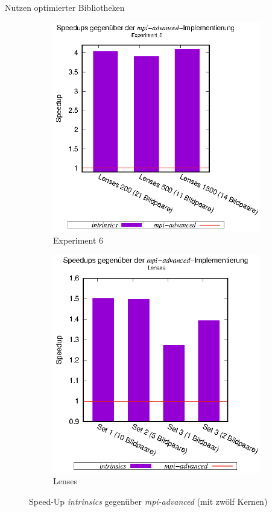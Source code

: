 \begin{frame}{Nutzen optimierter Bibliotheken}
	\begin{figure}[h]
		\begin{subfigure}[b]{0.47\textwidth}
			\centering
			\includegraphics[width=\textwidth]{pdf/speedups_intrinsics_exp6}
			\caption{Experiment 6}
		\end{subfigure}
		\hfill
		\begin{subfigure}[b]{0.47\textwidth}
			\centering
			\includegraphics[width=\textwidth]{pdf/speedups_intrinsics_lenses}
			\caption{Lenses}
		\end{subfigure}
		\caption{Speed-Up \textit{intrinsics} gegenüber \textit{mpi-advanced} (mit zwölf Kernen)}
	\end{figure}
\end{frame}


